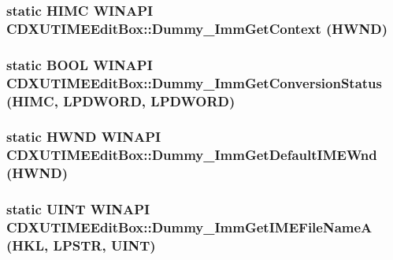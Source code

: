 \label{class_c_d_x_u_t_i_m_e_edit_box_a45677be982c66ec3db85f619ebab910b}
\hypertarget{class_c_d_x_u_t_i_m_e_edit_box_adc9a00e652fc7ddeb39674bb38998848}{
\subsubsection[{Dummy\_\-ImmGetContext}]{\setlength{\rightskip}{0pt plus 5cm}static {\bf HIMC} WINAPI CDXUTIMEEditBox::Dummy\_\-ImmGetContext (HWND)}}
\label{class_c_d_x_u_t_i_m_e_edit_box_adc9a00e652fc7ddeb39674bb38998848}
\hypertarget{class_c_d_x_u_t_i_m_e_edit_box_a1c601fc105fded94dddc03d5201886bd}{
\subsubsection[{Dummy\_\-ImmGetConversionStatus}]{\setlength{\rightskip}{0pt plus 5cm}static {\bf BOOL} WINAPI CDXUTIMEEditBox::Dummy\_\-ImmGetConversionStatus ({\bf HIMC}, \/  {\bf LPDWORD}, \/  {\bf LPDWORD})}}
\label{class_c_d_x_u_t_i_m_e_edit_box_a1c601fc105fded94dddc03d5201886bd}
\hypertarget{class_c_d_x_u_t_i_m_e_edit_box_a9fed648c769d710f28388f9f8113db28}{
\subsubsection[{Dummy\_\-ImmGetDefaultIMEWnd}]{\setlength{\rightskip}{0pt plus 5cm}static HWND WINAPI CDXUTIMEEditBox::Dummy\_\-ImmGetDefaultIMEWnd (HWND)}}
\label{class_c_d_x_u_t_i_m_e_edit_box_a9fed648c769d710f28388f9f8113db28}
\hypertarget{class_c_d_x_u_t_i_m_e_edit_box_a2741f033ba2d986072d42e06cfe6964e}{
\subsubsection[{Dummy\_\-ImmGetIMEFileNameA}]{\setlength{\rightskip}{0pt plus 5cm}static {\bf UINT} WINAPI CDXUTIMEEditBox::Dummy\_\-ImmGetIMEFileNameA (HKL, \/  {\bf LPSTR}, \/  {\bf UINT})}}
